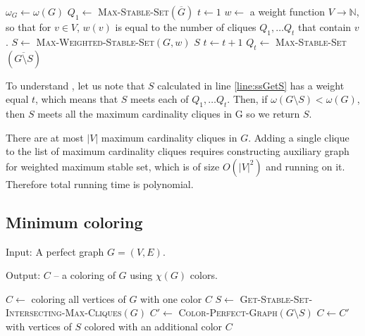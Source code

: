 \begin{algorithmic}[1]
  \ls $\omega_G \gets \omega(G)$
  \ls $Q_1 \gets$ \textsc{Max-Stable-Set}$(\overline{G})$
  \ls $t \gets 1$
  \ls $w \gets$ a weight function $V \rightarrow \mathbb{N}$, so that for $v \in V$, $w(v)$ is equal to
  \lsx the number of cliques $Q_1, \ldots Q_t$ that contain $v$.
  \ls $S \gets$ \textsc{Max-Weighted-Stable-Set}$(G, w)$ \label{line:ssGetS}
  \ls \RETURN $S$
  \mElse
  \ls $t \gets t+1$ \vspace{-.1cm}
  \ls $Q_t \gets$ \textsc{Max-Stable-Set}$(\overline{G \setminus S})$
  \mEndIf
  \mEndWhile
  \mEndProcedure
\end{algorithmic}

To understand , let us note that $S$ calculated in line \ref{line:ssGetS} has a weight equal $t$, which means that $S$ meets each of $Q_1, \ldots Q_t$. Then, if $\omega(G \setminus S) < \omega(G)$, then $S$ meets all the maximum cardinality cliques in G so we return $S$.

There are at most $|V|$ maximum cardinality cliques in $G$. Adding a single clique to the list of maximum cardinality cliques requires constructing auxiliary graph for weighted maximum stable set, which is of size $O(|V|^2)$ and running  on it. Therefore total running time is polynomial.

\subsection{Minimum coloring}

\begin{alg}
  \label{alg:minColoring}
  Input: A perfect graph $G = (V, E)$.

  \noindent Output: $C$ -- a coloring of $G$ using $\chi(G)$ colors.
\end{alg}

\begin{algorithmic}[1]
  \ls $C \gets$ coloring all vertices of $G$ with one color
  \ls \RETURN $C$
  \mElse
  \ls $S \gets$ \textsc{Get-Stable-Set-Intersecting-Max-Cliques}$(G)$
  \ls $C' \gets$ \textsc{Color-Perfect-Graph}$(G \setminus S)$
  \ls $C \gets C'$ with vertices of $S$ colored with an additional color
  \ls \RETURN $C$
  \mEndIf
  \mEndProcedure
\end{algorithmic}

